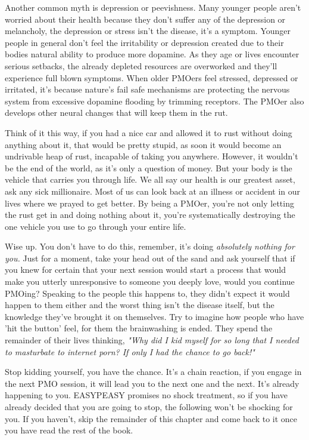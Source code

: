 \documentclass[easypeasy.tex]{subfiles}
\begin{document}
Another common myth is depression or peevishness. Many younger people aren't worried about their health because they don't suffer any of the depression or melancholy, the depression or stress isn't the disease, it's a symptom. Younger people in general don't feel the irritability or depression created due to their bodies natural ability to produce more dopamine. As they age or lives encounter serious setbacks, the already depleted resources are overworked and they'll experience full blown symptoms. When older PMOers feel stressed, depressed or irritated, it's because nature's fail safe mechanisms are protecting the nervous system from excessive dopamine flooding by trimming receptors. The PMOer also develops other neural changes that will keep them in the rut.

Think of it this way, if you had a nice car and allowed it to rust without doing anything about it, that would be pretty stupid, as soon it would become an undrivable heap of rust, incapable of taking you anywhere. However, it wouldn't be the end of the world, as it's only a question of money. But your body is the vehicle that carries you through life. We all say our health is our greatest asset, ask any sick millionaire. Most of us can look back at an illness or accident in our lives where we prayed to get better. By being a PMOer, you're not only letting the rust get in and doing nothing about it, you're systematically destroying the one vehicle you use to go through your entire life.

Wise up. You don't have to do this, remember, it's doing \textit{absolutely nothing for you.} Just for a moment, take your head out of the sand and ask yourself that if you knew for certain that your next session would start a process that would make you utterly unresponsive to someone you deeply love, would you continue PMOing? Speaking to the people this happens to, they didn't expect it would happen to them either and the worst thing isn't the disease itself, but the knowledge they've brought it on themselves. Try to imagine how people who have 'hit the button' feel, for them the brainwashing is ended. They spend the remainder of their lives thinking, \textit{"Why did I kid myself for so long that I needed to masturbate to internet porn? If only I had the chance to go back!"}

Stop kidding yourself, you have the chance. It's a chain reaction, if you engage in the next PMO session, it will lead you to the next one and the next. It's already happening to you. EASYPEASY promises no shock treatment, so if you have already decided that you are going to stop, the following won't be shocking for you. If you haven't, skip the remainder of this chapter and come back to it once you have read the rest of the book.
\end{document}
